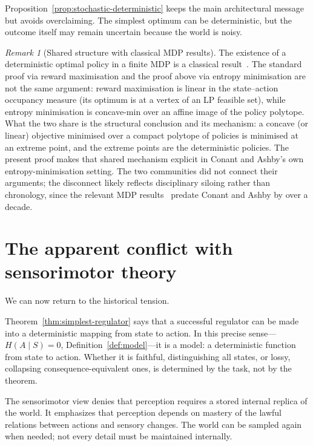 \documentclass[11pt]{article}
\theoremstyle{remark}
\newtheorem{remark}{Remark}
\newcommand{\1}{\mathbb 1}
\begin{document}
Proposition~\ref{prop:stochastic-deterministic} keeps the main architectural message but avoids overclaiming. The simplest optimum can be deterministic, but the outcome itself may remain uncertain because the world is noisy.

\begin{remark}[Shared structure with classical MDP results]
The existence of a deterministic optimal policy in a finite MDP is a classical result~\citep{Bellman-dynamic57,Puterman-markov94,Sutton-reinforcement18}. The standard proof via reward maximisation and the proof above via entropy minimisation are not the same argument: reward maximisation is linear in the state--action occupancy measure (its optimum is at a vertex of an LP feasible set), while entropy minimisation is concave-min over an affine image of the policy polytope. What the two share is the structural conclusion and its mechanism: a concave (or linear) objective minimised over a compact polytope of policies is minimised at an extreme point, and the extreme points are the deterministic policies. The present proof makes that shared mechanism explicit in Conant and Ashby's own entropy-minimisation setting. The two communities did not connect their arguments; the disconnect likely reflects disciplinary siloing rather than chronology, since the relevant MDP results~\citep{Bellman-dynamic57} predate Conant and Ashby by over a decade.
\end{remark}

\section{The apparent conflict with sensorimotor theory}

We can now return to the historical tension.

Theorem~\ref{thm:simplest-regulator} says that a successful regulator can be made into a deterministic mapping from state to action. In this precise sense---$H(A\mid S)=0$, Definition~\ref{def:model}---it is a model: a deterministic function from state to action. Whether it is faithful, distinguishing all states, or lossy, collapsing consequence-equivalent ones, is determined by the task, not by the theorem.

The sensorimotor view denies that perception requires a stored internal replica of the world. It emphasizes that perception depends on mastery of the lawful relations between actions and sensory changes. The world can be sampled again when needed; not every detail must be maintained internally.
\end{document}
